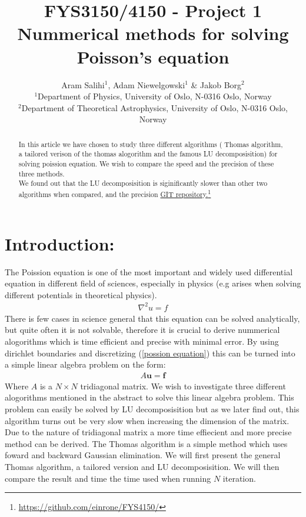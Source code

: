 \documentclass[a4paper, 10pt]{article}
\title{FYS3150/4150 - Project 1\\
  Nummerical methods for solving Poisson's equation}
\author{Aram Salihi$^1$, Adam Niewelgowski$^1$ \& Jakob Borg$^2$\\
  \small $^1$Department of Physics, University of Oslo, N-0316 Oslo, Norway\\
  \small $^2$Department of Theoretical Astrophysics, University of Oslo, N-0316 Oslo, Norway}
\begin{document}
\maketitle
\begin{abstract}
  \begin{center}
    In this article we have chosen to study three different algorithms (
    Thomas algorithm, a tailored verison of the thomas alogorithm
    and the famous LU decomposisition) for solving poission equation. We wish to
    compare the speed and the precision  of these three methods.
    \\
    We found out that the LU decomposisition is siginificantly slower than other two algorithms when compared,
    and the precision
    \href{https://github.com/einrone/FYS4150/}{GIT repository.}\footnote{\url{https://github.com/einrone/FYS4150/}}
  \end{center}
\end{abstract}
\section{Introduction:} The Poission equation is one of the most important and
widely used differential equation in different field of sciences,
especially in physics (e.g arises when solving different potentials in theoretical physics).
\begin{align}
  \nabla^{2}u = f
  \label{possion equation}
\end{align}
There is few cases in science general that this equation can be solved analytically, but quite
often it is not solvable, therefore it is crucial to derive nummerical alogorithms which is
time efficient and precise with minimal error. By using dirichlet boundaries and discretizing (\ref{possion equation})
this can be turned into a simple linear algebra problem on the form:
\begin{align}
  A\mathbf{u} = \mathbf{f}
\end{align}
Where $A$ is a $N \times N$ tridiagonal matrix. We wish to investigate three different alogorithms
mentioned in the abstract to solve this linear algebra problem. This problem can easily be solved by
LU decomposisition but as we later find out, this algorithm turns out be very slow when increasing
the dimension of the matrix. Due to the nature of tridiagonal matrix a more time effiecient and more precise method can be derived.
The Thomas algorithm is a simple method which uses foward and backward Gaussian elimination.
We will first present the general Thomas algorithm, a tailored version and LU decomposisition. We will then
compare the result and time the time used when running $N$ iteration.
\end{document}
